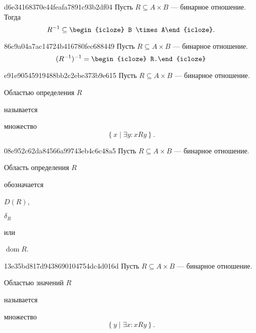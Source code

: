 \begin{note}{d6e34168370e44feafa7891c93b2df04}
    Пусть \({ R \subseteq A \times B }\) --- бинарное отношение.
    Тогда
    \[
        R^{-1} \subseteq \begin{icloze}{1}B \times A\end{icloze}.
    \]
\end{note}

\begin{note}{86c9a04a7ac14724b416780fec688449}
    Пусть \({ R \subseteq A \times B }\) --- бинарное отношение.
    \[
        (R^{-1})^{-1} = \begin{icloze}{1}R.\end{icloze}
    \]
\end{note}

\begin{note}{e91e90545919488bb2c2ebe373b9e615}
    Пусть \({ R \subseteq A \times B }\) --- бинарное отношение.
    \begin{icloze}{2}Областью определения \({ R }\)\end{icloze} называется
    \begin{icloze}{1}
        множество
        \[
            \left\{ x \mid \exists y : xRy \right\}.
        \]
    \end{icloze}
\end{note}

\begin{note}{08e952c62da84566a99743eb4c6c48a5}
    Пусть \({ R \subseteq A \times B }\) --- бинарное отношение.
    \begin{icloze}{2}Область определения \({ R }\)\end{icloze} обозначается \begin{icloze}{1}\({ D(R) }\),\end{icloze} \begin{icloze}{1}\({ \delta_{R} }\)\end{icloze} или \begin{icloze}{1}\({ \operatorname{dom} R }\).\end{icloze}
\end{note}

\begin{note}{13e35bd817d9438690104754dc4d016d}
    Пусть \({ R \subseteq A \times B }\) --- бинарное отношение.
    \begin{icloze}{2}Областью значений \({ R }\)\end{icloze} называется
    \begin{icloze}{1}
        множество
        \[
            \left\{ y \mid \exists x : xRy \right\}.
        \]
    \end{icloze}
\end{note}

